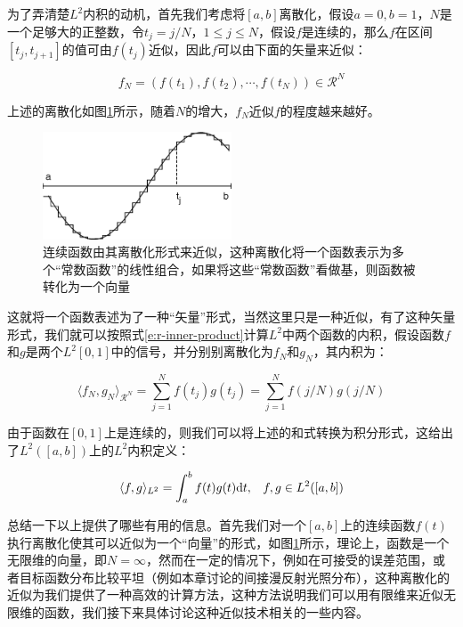 为了弄清楚$L^{2}$内积的动机，首先我们考虑将$[a,b]$离散化，假设$a=0,b=1$，$N$是一个足够大的正整数，令$t_j=j/N$，$1\leq j\leq N$，假设$f$是连续的，那么$f$在区间$[t_j,t_{j+1}]$的值可由$f(t_j)$近似，因此$f$可以由下面的矢量来近似：

\begin{equation}
	f_N=(f(t_1),f(t_2),\cdots,f(t_N))\in \mathcal{R}^{N}
\end{equation}

\noindent 上述的离散化如图\ref{f:r-function-approximation}所示，随着$N$的增大，$f_N$近似$f$的程度越来越好。

\begin{figure}
	\sidecaption
	\includegraphics[width=0.5\textwidth]{figures/r/function-approximation}
	\caption{连续函数由其离散化形式来近似，这种离散化将一个函数表示为多个“常数函数”的线性组合，如果将这些“常数函数”看做基，则函数被转化为一个向量}
	\label{f:r-function-approximation}
\end{figure}

这就将一个函数表述为了一种“矢量”形式，当然这里只是一种近似，有了这种矢量形式，我们就可以按照式\ref{e:r-inner-product}计算$L^{2}$中两个函数的内积，假设函数$f$和$g$是两个$L^{2}[0,1]$中的信号，并分别别离散化为$f_N$和$g_N$，其内积为：

\begin{equation}
	\langle f_N,g_N\rangle_{\mathcal{R}^{N}}=\sum^{N}_{j=1}f(t_j)g(t_j)=\sum^{N}_{j=1}f(j/N)g(j/N)
\end{equation}

\noindent 由于函数在$[0,1]$上是连续的，则我们可以将上述的和式转换为积分形式，这给出了$L^{2}([a,b])$上的$L^{2}$内积定义：

\begin{equation}\label{e:r-l2-inner-product}
\begin{aligned}
	\langle f,g\rangle_{L^{2}}=\int^{b}_a f(t)g(t){\rm d}t, && f,g\in L^{2}([a,b])
\end{aligned}
\end{equation}

总结一下以上提供了哪些有用的信息。首先我们对一个$[a,b]$上的连续函数$f(t)$执行离散化使其可以近似为一个“向量”的形式，如图\ref{f:r-function-approximation}所示，理论上，函数是一个无限维的向量，即$N=\infty$，然而在一定的情况下，例如在可接受的误差范围，或者目标函数分布比较平坦（例如本章讨论的间接漫反射光照分布），这种离散化的近似为我们提供了一种高效的计算方法，这种方法说明我们可以用有限维来近似无限维的函数，我们接下来具体讨论这种近似技术相关的一些内容。




